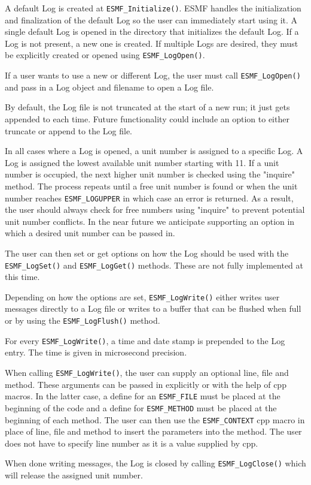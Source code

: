 

A default Log is created at {\tt ESMF\_Initialize()}.  ESMF handles 
the initialization and finalization of the default Log so the user 
can immediately start using it.  A single default Log is opened 
in the directory that initializes the default Log.  If a Log is 
not present, a new one is created.  If multiple Logs are 
desired, they must be explicitly created or opened using 
{\tt ESMF\_LogOpen()}.

If a user wants to use a new or different Log, the user must call
{\tt ESMF\_LogOpen()} and pass in a Log object and filename to open a Log 
file.
 
By default, the Log file is not truncated at the start of a new run; it just
gets appended to each time.  Future functionality could include an option to
either truncate or append to the Log file. 

In all cases where a Log is opened, a unit number is assigned to a specific
Log.  A Log is assigned the lowest available unit number starting with
11.  If a unit number is occupied, the next higher unit number is 
checked using the "inquire" method.  The process repeats until a free unit 
number is found or when the unit number reaches {\tt ESMF\_LOGUPPER} in 
which case an error is returned.  As a result, the user should always check
for free numbers using "inquire" to prevent potential unit number conflicts.
In the near future we anticipate supporting an option in which a desired
unit number can be passed in.

The user can then set or get options on how the Log should be used 
with the {\tt ESMF\_LogSet()} and {\tt ESMF\_LogGet()} methods.  These are 
not fully implemented at this time. 

Depending on how the options are set, {\tt ESMF\_LogWrite()} either writes user
messages directly to a Log file or writes to a buffer that can be flushed when 
full or by using the {\tt ESMF\_LogFlush()} method.

For every {\tt ESMF\_LogWrite()}, a time and date stamp is prepended to the
Log entry.  The time is given in microsecond precision.

When calling {\tt ESMF\_LogWrite()}, the user can supply an optional line,
file and method.  These arguments can be passed in explicitly or with the help
of cpp macros.  In the latter case, a define for an {\tt ESMF\_FILE} must be 
placed at the beginning of the code and a define for {\tt ESMF\_METHOD} must
be placed at the beginning of each method.  The user can then use the
{\tt ESMF\_CONTEXT} cpp macro in place of line, file and method to insert the 
parameters into the method.  The user does not have to specify line number as
it is a value supplied by cpp.

When done writing messages, the Log is closed by calling 
{\tt ESMF\_LogClose()} which will release the assigned unit number.




